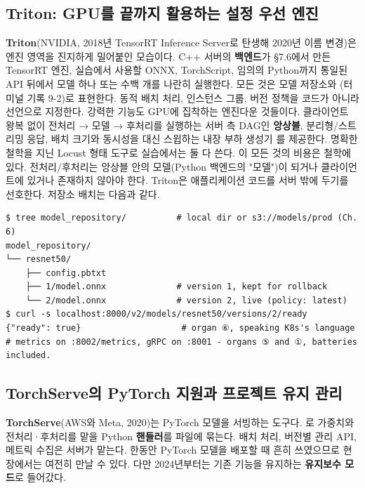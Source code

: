 \subsection*{Triton: GPU를 끝까지 활용하는 설정 우선 엔진}

\textbf{Triton}(NVIDIA, 2018년 TensorRT Inference Server로 탄생해 2020년 이름 변경)은 엔진 영역을 진지하게 밀어붙인 모습이다. C++ 서버의 \textbf{백엔드}가 §7.6에서 만든 TensorRT 엔진, 실습에서 사용할 ONNX, TorchScript, 임의의 Python까지 통일된 API 뒤에서 모델 하나 또는 수백 개를 나란히 실행한다. 모든 것은 모델 저장소와 (터미널 기록 9-2)로 표현한다. 동적 배치 처리, 인스턴스 그룹, 버전 정책을 코드가 아니라 선언으로 지정한다. 강력한 기능도 GPU에 집착하는 엔진다운 것들이다. 클라이언트 왕복 없이 전처리 → 모델 → 후처리를 실행하는 서버 측 DAG인 \textbf{앙상블}, 분리형/스트리밍 응답, 배치 크기와 동시성을 대신 스윕하는 내장 부하 생성기 를 제공한다. 명확한 철학을 지닌 Locust 형태 도구로 실습에서는 둘 다 쓴다. 이 모든 것의 비용은 철학에 있다. 전처리/후처리는 앙상블 안의 모델(Python 백엔드의 "모델")이 되거나 클라이언트에 있거나 존재하지 않아야 한다. Triton은 애플리케이션 코드를 서버 밖에 두기를 선호한다. 저장소 배치는 다음과 같다.

\begin{terminalbox}
\begin{Verbatim}[breaklines=true,breakanywhere=true,fontsize=\small,formatcom=\color{tbbtermfg},codes=\tbbcodeactive]
$ tree model_repository/          # local dir or s3://models/prod (Ch. 6)
model_repository/
└── resnet50/
    ├── config.pbtxt
    ├── 1/model.onnx              # version 1, kept for rollback
    └── 2/model.onnx              # version 2, live (policy: latest)
$ curl -s localhost:8000/v2/models/resnet50/versions/2/ready
{"ready": true}                    # organ ⑥, speaking K8s's language
# metrics on :8002/metrics, gRPC on :8001 - organs ⑤ and ①, batteries included.
\end{Verbatim}
\end{terminalbox}

\subsection*{TorchServe의 PyTorch 지원과 프로젝트 유지 관리}

\textbf{TorchServe}(AWS와 Meta, 2020)는 PyTorch 모델을 서빙하는 도구다. 로 가중치와 전처리·후처리를 맡을 Python \textbf{핸들러}를  파일에 묶는다. 배치 처리, 버전별 관리 API, 메트릭 수집은 서버가 맡는다. 한동안 PyTorch 모델을 배포할 때 흔히 쓰였으므로 현장에서는 여전히 만날 수 있다. 다만 2024년부터는 기존 기능을 유지하는 \textbf{유지보수 모드}로 들어갔다.

